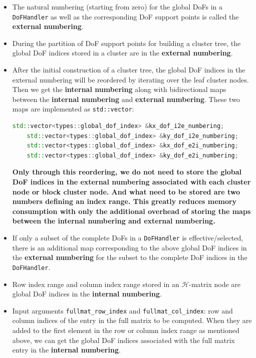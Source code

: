 \documentclass[11pt, a4paper]{article}
\begin{document}
\begin{itemize}
\item The natural numbering (starting from zero) for the global DoFs in a
  \texttt{DoFHandler} as well as the corresponding DoF support points is called the
  \textbf{external numbering}.
\item During the partition of DoF support points for building a cluster tree, the global
  DoF indices stored in a cluster are in the \textbf{external numbering}.
\item After the initial construction of a cluster tree, the global DoF indices in the
  external numbering will be reordered by iterating over the leaf cluster nodes. Then we
  get the \textbf{internal numbering} along with bidirectional maps between the
  \textbf{internal numbering} and \textbf{external numbering}. These two maps are
  implemented as \texttt{std::vector}:
  \begin{lstlisting}[language=C++]
    std::vector<types::global_dof_index> &kx_dof_i2e_numbering;
    std::vector<types::global_dof_index> &ky_dof_i2e_numbering;
    std::vector<types::global_dof_index> &kx_dof_e2i_numbering;
    std::vector<types::global_dof_index> &ky_dof_e2i_numbering;
  \end{lstlisting}
  \textbf{Only through this reordering, we do not need to store the global DoF indices in
    the external numbering associated with each cluster node or block cluster node. And
    what need to be stored are two numbers defining an index range. This greatly reduces
    memory consumption with only the additional overhead of storing the maps between the
    internal numbering and external numbering.}
\item If only a subset of the complete DoFs in a \texttt{DoFHandler} is
  effective/selected, there is an additional map corresponding to the above global DoF
  indices in the \textbf{external numbering} for the subset to the complete DoF indices in
  the \texttt{DoFHandler}.
\item Row index range and column index range stored in an \(\mathcal{H}\)-matrix node are
  global DoF indices in the \textbf{internal numbering}.
\item Input arguments \texttt{fullmat\_row\_index} and \texttt{fullmat\_col\_index}: row
  and column indices of the entry in the full matrix to be computed. When they are added
  to the first element in the row or column index range as mentioned above, we can get the
  global DoF indices associated with the full matrix entry in the \textbf{internal
    numbering}.

\end{itemize}
\end{document}
